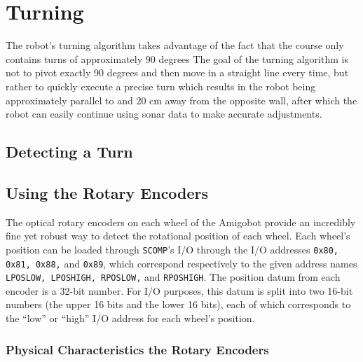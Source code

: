 \section{Turning}
The robot's turning algorithm takes advantage of the fact that the
course only contains turns of approximately 90 degrees %
The goal of the turning algorithm is not to pivot exactly 90 degrees
and then move in a straight line every time, but rather to quickly execute a precise turn which results
in the robot being approximately parallel to and 20 cm away from the
opposite wall, after which the robot can easily continue using sonar
data to make accurate adjustments.

\subsection{Detecting a Turn}

\subsection{Using the Rotary Encoders}

The optical rotary encoders on each wheel of the Amigobot provide an
incredibly fine yet robust way to detect the rotational position of
each wheel. Each wheel's position can be loaded through \verb+SCOMP+'s
I/O through the I/O addresses \verb+0x80, 0x81, 0x88,+ and
\verb+0x89+, which correspond respectively to the given address names
\verb+LPOSLOW, LPOSHIGH, RPOSLOW,+ and \verb+RPOSHIGH+. The position
datum from each encoder is a 32-bit number. For I/O purposes, this datum
is split into two 16-bit numbers (the upper 16 bits and the lower 16
bits), each of which corresponds to the ``low'' or ``high'' I/O
address for each wheel's position.

\subsubsection{Physical Characteristics the Rotary Encoders}

